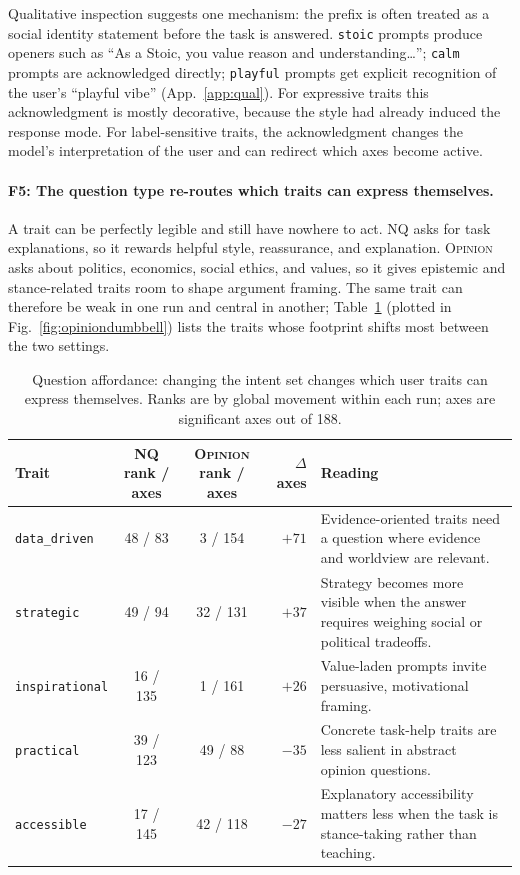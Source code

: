 \documentclass{article}
\newcommand{\ax}[1]{\texttt{#1}}   %
\begin{document}
Qualitative inspection suggests one mechanism: the prefix is often treated as a social identity statement before the task is answered. \ax{stoic} prompts produce openers such as ``As a Stoic, you value reason and understanding\ldots''; \ax{calm} prompts are acknowledged directly; \ax{playful} prompts get explicit recognition of the user's ``playful vibe'' (App.~\ref{app:qual}). For expressive traits this acknowledgment is mostly decorative, because the style had already induced the response mode. For label-sensitive traits, the acknowledgment changes the model's interpretation of the user and can redirect which axes become active.

\paragraph{F5: The question type re-routes which traits can express themselves.}
A trait can be perfectly legible and still have nowhere to act. \textsc{NQ} asks for task explanations, so it rewards helpful style, reassurance, and explanation. \textsc{Opinion} asks about politics, economics, social ethics, and values, so it gives epistemic and stance-related traits room to shape argument framing. The same trait can therefore be weak in one run and central in another; Table~\ref{tab:questionaffordance} (plotted in Fig.~\ref{fig:opiniondumbbell}) lists the traits whose footprint shifts most between the two settings.

\begin{table}[htbp]
\centering
\small
\begin{tabularx}{\textwidth}{lccrX}
\toprule
Trait & \textsc{NQ} rank / axes & \textsc{Opinion} rank / axes & $\Delta$ axes & Reading \\
\midrule
\ax{data\_driven} & 48 / 83 & 3 / 154 & $+71$ & Evidence-oriented traits need a question where evidence and worldview are relevant. \\
\ax{strategic} & 49 / 94 & 32 / 131 & $+37$ & Strategy becomes more visible when the answer requires weighing social or political tradeoffs. \\
\ax{inspirational} & 16 / 135 & 1 / 161 & $+26$ & Value-laden prompts invite persuasive, motivational framing. \\
\ax{practical} & 39 / 123 & 49 / 88 & $-35$ & Concrete task-help traits are less salient in abstract opinion questions. \\
\ax{accessible} & 17 / 145 & 42 / 118 & $-27$ & Explanatory accessibility matters less when the task is stance-taking rather than teaching. \\
\bottomrule
\end{tabularx}
\caption{Question affordance: changing the intent set changes which user traits can express themselves. Ranks are by global movement within each run; axes are significant axes out of 188.}
\label{tab:questionaffordance}
\end{table}
\end{document}
